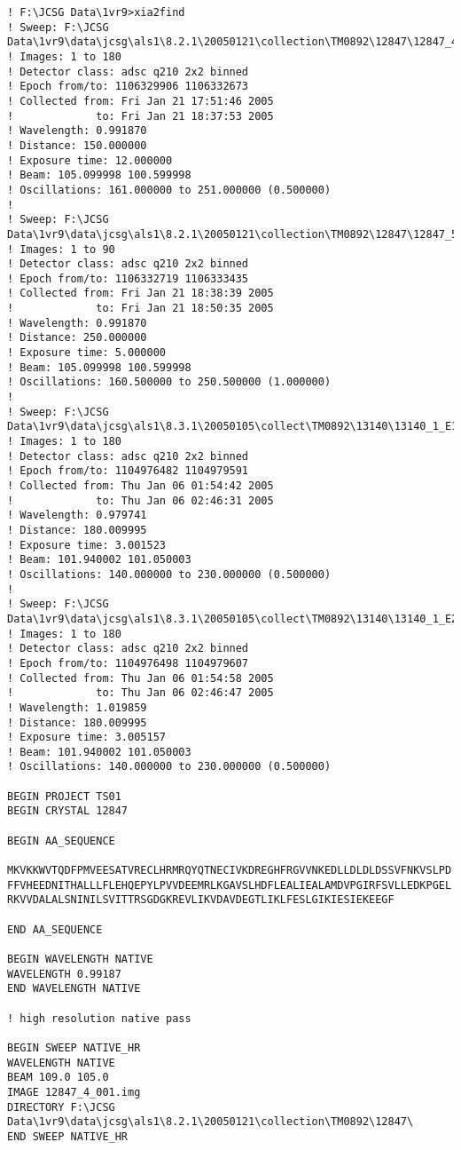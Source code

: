 \documentclass[a4paper, 11pt]{article}
\begin{document}
{
\small
\begin{verbatim}
! F:\JCSG Data\1vr9>xia2find
! Sweep: F:\JCSG Data\1vr9\data\jcsg\als1\8.2.1\20050121\collection\TM0892\12847\12847_4_###.img
! Images: 1 to 180
! Detector class: adsc q210 2x2 binned
! Epoch from/to: 1106329906 1106332673
! Collected from: Fri Jan 21 17:51:46 2005
!             to: Fri Jan 21 18:37:53 2005
! Wavelength: 0.991870
! Distance: 150.000000
! Exposure time: 12.000000
! Beam: 105.099998 100.599998
! Oscillations: 161.000000 to 251.000000 (0.500000)
! 
! Sweep: F:\JCSG Data\1vr9\data\jcsg\als1\8.2.1\20050121\collection\TM0892\12847\12847_5_###.img
! Images: 1 to 90
! Detector class: adsc q210 2x2 binned
! Epoch from/to: 1106332719 1106333435
! Collected from: Fri Jan 21 18:38:39 2005
!             to: Fri Jan 21 18:50:35 2005
! Wavelength: 0.991870
! Distance: 250.000000
! Exposure time: 5.000000
! Beam: 105.099998 100.599998
! Oscillations: 160.500000 to 250.500000 (1.000000)
! 
! Sweep: F:\JCSG Data\1vr9\data\jcsg\als1\8.3.1\20050105\collect\TM0892\13140\13140_1_E1_###.img
! Images: 1 to 180
! Detector class: adsc q210 2x2 binned
! Epoch from/to: 1104976482 1104979591
! Collected from: Thu Jan 06 01:54:42 2005
!             to: Thu Jan 06 02:46:31 2005
! Wavelength: 0.979741
! Distance: 180.009995
! Exposure time: 3.001523
! Beam: 101.940002 101.050003
! Oscillations: 140.000000 to 230.000000 (0.500000)
! 
! Sweep: F:\JCSG Data\1vr9\data\jcsg\als1\8.3.1\20050105\collect\TM0892\13140\13140_1_E2_###.img
! Images: 1 to 180
! Detector class: adsc q210 2x2 binned
! Epoch from/to: 1104976498 1104979607
! Collected from: Thu Jan 06 01:54:58 2005
!             to: Thu Jan 06 02:46:47 2005
! Wavelength: 1.019859
! Distance: 180.009995
! Exposure time: 3.005157
! Beam: 101.940002 101.050003
! Oscillations: 140.000000 to 230.000000 (0.500000)

BEGIN PROJECT TS01
BEGIN CRYSTAL 12847

BEGIN AA_SEQUENCE

MKVKKWVTQDFPMVEESATVRECLHRMRQYQTNECIVKDREGHFRGVVNKEDLLDLDLDSSVFNKVSLPD
FFVHEEDNITHALLLFLEHQEPYLPVVDEEMRLKGAVSLHDFLEALIEALAMDVPGIRFSVLLEDKPGEL
RKVVDALALSNINILSVITTRSGDGKREVLIKVDAVDEGTLIKLFESLGIKIESIEKEEGF

END AA_SEQUENCE

BEGIN WAVELENGTH NATIVE
WAVELENGTH 0.99187
END WAVELENGTH NATIVE

! high resolution native pass

BEGIN SWEEP NATIVE_HR
WAVELENGTH NATIVE
BEAM 109.0 105.0
IMAGE 12847_4_001.img
DIRECTORY F:\JCSG Data\1vr9\data\jcsg\als1\8.2.1\20050121\collection\TM0892\12847\
END SWEEP NATIVE_HR


\end{verbatim}}
\end{document}

